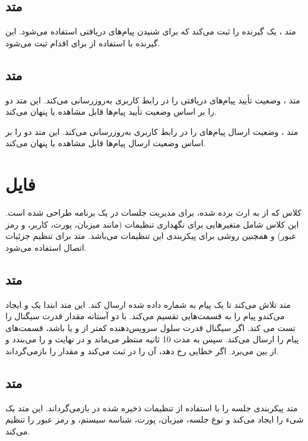 \documentclass{report}
\begin{document}
\subsection{متد
}
متد
، یک گیرنده
 را ثبت می‌کند که برای شنیدن پیام‌های دریافتی
   استفاده می‌شود. این گیرنده با استفاده از 
   برای اقدام
     ثبت می‌شود.

\subsection{متد
	}
متد
، وضعیت تأیید پیام‌های دریافتی را در رابط کاربری به‌روزرسانی می‌کند. این متد دو 
را بر اساس وضعیت تأیید پیام‌ها قابل مشاهده یا پنهان می‌کند.

متد
، وضعیت ارسال پیام‌های
  را در رابط کاربری به‌روزرسانی می‌کند. این متد دو 
  را بر اساس وضعیت ارسال پیام‌ها قابل مشاهده یا پنهان می‌کند.
\section{فایل
}
کلاس 
 که از
   به ارث برده شده، برای مدیریت جلسات
     در یک برنامه
       طراحی شده است. این کلاس شامل متغیرهایی برای نگهداری تنظیمات
         (مانند میزبان، پورت، کاربر، و رمز عبور) و همچنین روشی برای پیکربندی این تنظیمات می‌باشد. متد
           برای تنظیم جزئیات اتصال
             استفاده می‌شود.

\subsection{متد
}
متد
 تلاش می‌کند تا یک پیام 
  به شماره داده شده ارسال کند. این متد ابتدا یک
   و 
   ایجاد می‌کندو پیام را به قسمت‌هایی تقسیم می‌کند. با دو آستانه مقدار قدرت سیگنال را تست می کند. اگر سیگنال قدرت سلول سرویس‌دهنده کمتر از 
   و یا
    باشد، قسمت‌های پیام را ارسال می‌کند. سپس به مدت 
    10 
    ثانیه منتظر می‌ماند و در نهایت 
    و 
    را می‌بندد و از بین می‌برد. اگر خطایی رخ دهد، آن را در 
     ثبت می‌کند و مقدار 
     را بازمی‌گرداند.

\subsection{متد
}
متد 
پیکربندی جلسه 
را با استفاده از تنظیمات ذخیره شده در
 بازمی‌گرداند. این متد یک شیء 
 را ایجاد می‌کند و نوع جلسه، میزبان، پورت، شناسه سیستم، و رمز عبور را تنظیم می‌کند.
 
\end{document}
